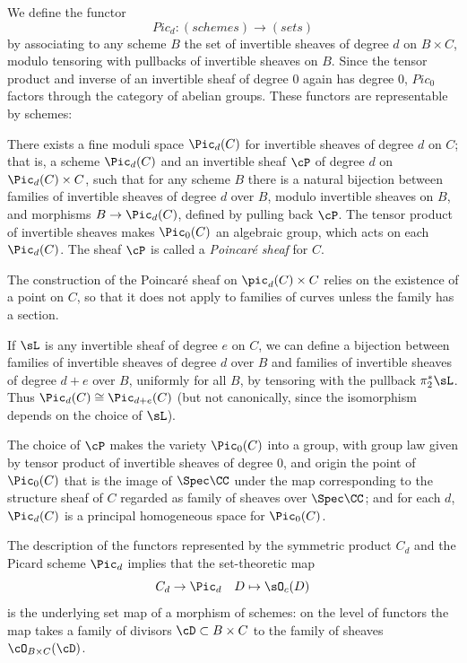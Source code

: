 We define the functor
 $$
 Pic_d : (schemes) \to (sets)
 $$
 by associating to any scheme $B$ the set of invertible sheaves of degree $d$ on $B \times C$, modulo tensoring with pullbacks of invertible sheaves on $B$. Since the tensor product and inverse of an invertible sheaf of degree 0 again has degree 0, 
 $Pic_0$ factors through the category of abelian groups. These functors are representable by schemes:
  
 \begin{fact}\cite[Theorem 9.4.8]{Kleiman-PicardScheme}
 There exists a fine moduli space $\Pic_d(C)$ for invertible sheaves of degree $d$ on $C$; that is, a scheme $\Pic_d(C)$ and an invertible sheaf $\cP$ of degree $d$ on $\Pic_d(C) \times C$, such that for any scheme $B$ there is a natural bijection between families of invertible sheaves of degree $d$ over $B$, modulo invertible sheaves on $B$, and morphisms $B \to \Pic_d(C)$, defined by pulling back $\cP$. The tensor product of invertible sheaves makes $\Pic_0(C)$ an algebraic group, which acts on each $\Pic_d(C)$. The sheaf $\cP$ is called a \emph{Poincar\'e sheaf} for $C$.
 \end{fact}
 
The construction of the Poincar\'e sheaf on $\pic_d(C) \times C$ relies on the existence of a point on $C$, so that it does not apply to families of curves unless the family has a section.
 
If $\sL$ is any invertible sheaf of degree $e$ on $C$, we can define a bijection between families of invertible sheaves of degree $d$ over $B$ and families of invertible sheaves of degree $d+e$ over $B$, uniformly for all $B$, by tensoring with the pullback $\pi_2^*\sL$. Thus $\Pic_d(C) \cong \Pic_{d+e}(C)$ (but not canonically, since the isomorphism depends on the choice of $\sL$).
 
The choice of $\cP$ makes the variety $\Pic_0(C)$ into a group, with group law given by tensor product of invertible sheaves of degree 0, and origin the point of $\Pic_0(C)$ that is the
 image of $\Spec \CC$ under the map corresponding to the structure sheaf of $C$ regarded
 as family of sheaves over $\Spec \CC$; and for each $d$, $\Pic_d(C)$ is a principal homogeneous space for $\Pic_0(C)$. 
 
The description of the functors represented by the symmetric product $C_d$ and the Picard scheme $\Pic_d$ implies that the 
set-theoretic map
$$
C_d \to \Pic_d \quad D \mapsto \sO_c(D)
$$
is the underlying set map of a morphism of schemes: on the level of functors the map takes a family of divisors $\cD\subset B\times C$
to the family of sheaves $\cO_{B\times C}(\cD)$.

